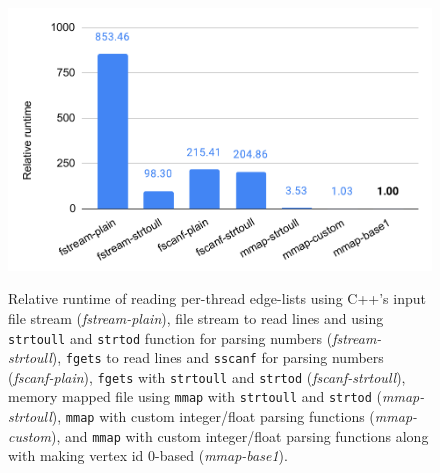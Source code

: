 \begin{figure}[hbtp]
  \centering
  \includegraphics[width=0.99\linewidth]{out/optimize-el.pdf} \\[-2ex]
  \caption{Relative runtime of reading per-thread edge-lists using C++'s input file stream (\textit{fstream-plain}), file stream to read lines and using  \texttt{strtoull} and \texttt{strtod} function for parsing numbers (\textit{fstream-strtoull}), \texttt{fgets} to read lines and \texttt{sscanf} for parsing numbers (\textit{fscanf-plain}), \texttt{fgets} with \texttt{strtoull} and \texttt{strtod} (\textit{fscanf-strtoull}), memory mapped file using \texttt{mmap} with \texttt{strtoull} and \texttt{strtod} (\textit{mmap-strtoull}), \texttt{mmap} with custom integer/float parsing functions (\textit{mmap-custom}), and \texttt{mmap} with custom integer/float parsing functions along with making vertex id 0-based (\textit{mmap-base1}).}
  \label{fig:optimize-el}
\end{figure}
